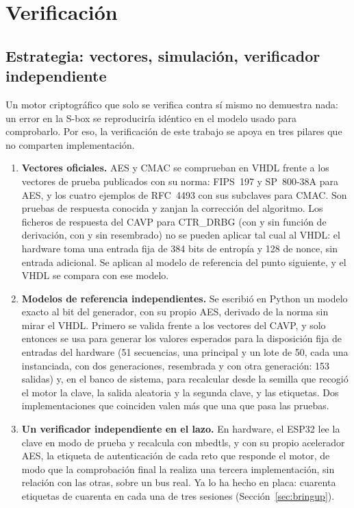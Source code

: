 \chapter{Verificación}
\label{ch:ch5_verification}


\section{Estrategia: vectores, simulación, verificador independiente}
\label{sec:verif_strategy}

Un motor criptográfico que solo se verifica contra sí mismo no demuestra
nada: un error en la S-box se reproduciría idéntico en el modelo usado
para comprobarlo. Por eso, la verificación de este trabajo se apoya en
tres pilares que no comparten implementación.

\begin{enumerate}
\item \textbf{Vectores oficiales.} AES y CMAC se comprueban en VHDL
frente a los vectores de prueba publicados con su norma: FIPS~197 y
SP~800-38A para AES, y los cuatro ejemplos de RFC~4493 con sus subclaves
para CMAC. Son pruebas de respuesta conocida y zanjan la corrección del
algoritmo. Los ficheros de respuesta del CAVP para CTR\_DRBG (con y sin
función de derivación, con y sin resembrado) no se pueden aplicar tal
cual al VHDL: el hardware toma una entrada fija de 384 bits de entropía y
128 de nonce, sin entrada adicional. Se aplican al modelo de referencia
del punto siguiente, y el VHDL se compara con ese modelo.
\item \textbf{Modelos de referencia independientes.} Se escribió en
Python un modelo exacto al bit del generador, con su propio AES,
derivado de la norma sin mirar el VHDL. Primero se valida frente a los
vectores del CAVP, y solo entonces se usa para generar los valores
esperados para la disposición fija de entradas del hardware (51
secuencias, una principal y un lote de 50, cada una instanciada, con dos
generaciones, resembrada y con otra generación: 153 salidas) y, en el
banco de sistema, para recalcular desde la
semilla que recogió el motor la clave, la salida aleatoria y la segunda
clave, y las etiquetas. Dos implementaciones que coinciden valen más que
una que pasa las pruebas.
\item \textbf{Un verificador independiente en el lazo.} En hardware, el
ESP32 lee la clave en modo de prueba y recalcula con mbedtls, y con su
propio acelerador AES, la etiqueta de autenticación de cada reto que
responde el motor, de modo que la comprobación final la realiza una
tercera implementación, sin relación con las otras, sobre un bus real.
Ya lo ha hecho en placa: cuarenta etiquetas de cuarenta en cada una de
tres sesiones \meas{} (Sección~\ref{sec:bringup}).
\end{enumerate}

